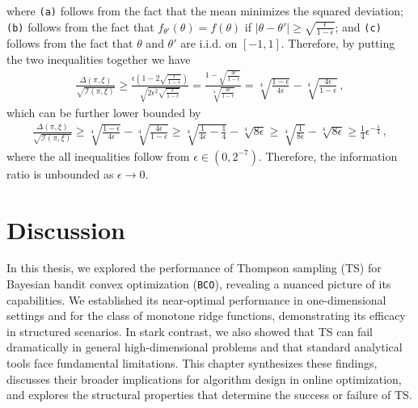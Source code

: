 \documentclass[letter, 12pt]{report}
\newcommand{\paren}[1]{\left( #1 \right)}
\newcommand{\I}{\mathcal{I}}
\newcommand{\1}{\mathbf{1}}
\newcommand{\bco}{\texttt{BCO}\xspace}
\newcommand{\ts}{\textsc{TS}\xspace}
\theoremstyle{plain}
\theoremstyle{definition}
\theoremstyle{remark}
\begin{document}
where \texttt{(a)} follows from the fact that the mean minimizes the squared deviation;
\texttt{(b)} follows from the fact that $f_{\theta'}(\theta) = f(\theta)$
if $|\theta - \theta'| \geq \sqrt{\frac{\epsilon}{1-\epsilon}}$;
and \texttt{(c)} follows from the fact that $\theta$ and $\theta'$ are i.i.d. on $[-1,1]$.
Therefore, by putting the two inequalities together we have
\begin{align*}
    \frac{
        \Delta(\pi, \xi)
    }{
        \sqrt{\I(\pi, \xi)}
    }
    \geq
    \frac{
        \epsilon \paren{1 - 2 \sqrt{\frac{\epsilon}{1-\epsilon}}}
    }{
        \sqrt{2 \epsilon^2\sqrt{\frac{\epsilon}{1-\epsilon}}}
    }
    =
    \frac{
        1 - \sqrt{\frac{4\epsilon}{1-\epsilon}}
    }{
        \sqrt[4]{\frac{4\epsilon}{1-\epsilon}}
    }
    =
    \sqrt[4]{\frac{1-\epsilon}{4\epsilon}}
    -
    \sqrt[4]{\frac{4\epsilon}{1-\epsilon}}\,,
\end{align*}
which can be further lower bounded by
\begin{align*}
    \frac{
        \Delta(\pi, \xi)
    }{
        \sqrt{\I(\pi, \xi)}
    }
    \geq
    \sqrt[4]{\frac{1-\epsilon}{4\epsilon}}
    -
    \sqrt[4]{\frac{4\epsilon}{1-\epsilon}}
    \geq
    \sqrt[4]{\frac{1}{4\epsilon} - \frac{1}{4}}
    -
    \sqrt[4]{8\epsilon}
    \geq
    \sqrt[4]{\frac{1}{8\epsilon}}
    -
    \sqrt[4]{8\epsilon}
    \geq
    \frac{1}{4}\epsilon^{-\frac14}\,,
\end{align*}
where the all inequalities follow from $\epsilon \in (0,2^{-7})$.
Therefore, the information ratio is unbounded as $\epsilon \to 0$.

\chapter{Discussion}
In this thesis, we explored the performance of Thompson sampling (\ts) for Bayesian bandit convex optimization (\bco), revealing a nuanced picture of its capabilities.
We established its near-optimal performance in one-dimensional
settings and for the class of monotone ridge functions,
demonstrating its efficacy in structured scenarios.
In stark contrast, we also showed that \ts can fail dramatically
in general high-dimensional problems and that standard analytical tools
face fundamental limitations.
This chapter synthesizes these findings, discusses their broader implications
for algorithm design in online optimization,
and explores the structural properties that determine the success or
failure of \ts.
\end{document}
